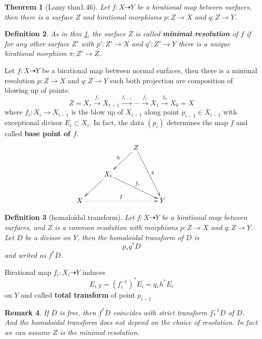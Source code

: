 \documentclass{article}
\newtheorem{defn}{Definition}[section]
\newtheorem{thm}[defn]{Theorem}
\newtheorem{rmk}[defn]{Remark}
\begin{document}
\begin{thm}[Lamy thm1.46]\label{resolve}
    Let $ f:X\dashrightarrow Y $ be a birational map between surfaces, then there is a surface $ Z $ and birational morphisms $ p:Z\to X $ and $ q:Z\to Y $.
\end{thm}


\begin{defn}\label{minresolve}
  As in thm \ref{resolve}, the surface $ Z $ is called \textbf{minimal resolution} of $ f $ if for any other surface $ Z' $ with $ p':Z'\to X $ and $ q':Z'\to Y $ there is a unique birational morphism $ \pi:Z'\to Z $.
\end{defn}

Let $ f:X\dashrightarrow Y $ be a birational map between normal surfaces, then there is a minimal resolution $ p:Z\to X $ and $ q:Z\to Y $ such both projection are composition of blowing up of points:
\[ Z=X_r\xrightarrow{f_r}X_{r-1}\xrightarrow{f_{r-1}}\cdots\xrightarrow{f_1}X_1\xrightarrow{f_0}X_0=X \]
where $ f_i:X_i\to X_{i-1} $ is the blow up of $ X_{i-1} $ along point $ p_{i-1}\in X_{i-1} $ with exceptional divisor $ E_i\subset X_i $. In fact, the data $ (p_i) $ determines the map $ f $ and called \textbf{base point of $ f $}.
\[ \xymatrix{
  &&Z\ar[ld]_h\ar[rdd]^q&&\\
  &X_i\ar[ld]\ar[rrd]^{f_i}&&\\
  X\ar@{.>}[rrr]^f&&&Y} \]



\begin{defn}[homaloidal transform]
  Let $ f:X\dashrightarrow Y $ be a birational map between surfaces, and  $ Z $ is a common resolution with  morphisms $ p:Z\to X $ and $ q:Z\to Y $. Let $ D $ be a divisor on $ Y $, then the homaloidal transform of $ D $ is 
  \[ p_*q^*D \]
  and writed as $ f^{*}D $. 
\end{defn}



Birational map $ f_i:X_i\dashrightarrow Y $ induces 
\[ E_{i,Y}=(f_i^{-1})^*E_i=q_*h^*E_i \]
on $ Y $ and called \textbf{total transform} of point $ p_{i-1} $ 


\begin{rmk}
  If $ D $ is free, then $ f^*D $ coincides with strict transform $ f^{-1}_*D $ of $ D $. And the homaloidal transform does not depend on the choice of resolution. In fact we can assume $ Z $ is the minimal resolution.
\end{rmk}
\end{document}
